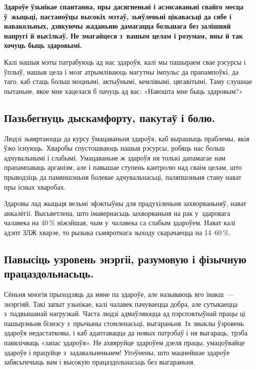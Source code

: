 \textbf{Здароўе ўзьнікае спантанна, пры дасягненьні і асэнсаваньні свайго месца ў~жыцьці, пастаноўцы высокіх мэтаў, зьяўленьні цікавасьці да сябе і навакольных, дзякуючы жаданьню дамагацца большага без залішняй напругі й высілкаў. Не змагайцеся з~вашым целам і розумам, яны й так хочуць быць здаровымі.}

Калі нашыя мэты патрабуюць ад нас здароўя, калі мы пашыраем свае рэсурсы і ўплыў, нашыя цела і мозг атрымліваюць магутны імпульс да прапампоўкі, да таго, каб стаць больш моцнымі, актыўнымі, кемлівымі, цягавітымі. Таму слушнае пытаньне, якое мне хацелася б пачуць ад вас: «Навошта мне быць здаровым?» 


\subsection*{Пазьбегнуць дыскамфорту, пакутаў і болю.}

Людзі зьвяртаюцца да курсу ўмацаваньня здароўя, каб вырашыць праблемы, якія ўжо існуюць. Хваробы спустошваюць нашыя рэсурсы, робяць нас больш адчувальнымі і слабымі. Умацаваньне ж здароўя ня толькі дапамагае нам прапампаваць арганізм, але і павышае ступень кантролю над сваім целам, што прыводзіць да памяншэньня болевае адчувальнасьці, паляпшэньня стану нават пры існых хваробах.

Здаровы лад жыцьця вельмі эфэктыўны для прадухіленьня захворваньняў, нават анкалёгіі. Высьветлена, што імавернасьць захворваньня на рак у~здаровага чалавека на 40\,\% ніжэйшая, чым у~чалавека са слабым здароўем. Нават калі адэпт ЗЛЖ хварэе, то рызыка сьмяротнага зыходу скарачаецца на 14--60\,\%.

\subsection*{Павысіць узровень энэргіі, разумовую і фізычную працаздольнасьць.} 
Сёньня многія прыходзяць да мяне па здароўе, але называюць яго інакш~--- энэргіяй. Такі запыт узьнікае, калі чалавек пачуваецца добра, але сутыкаецца з~падвышанай нагрузкай. Часта людзі адмаўляюцца ад пэрспэктыўнай працы ці пашырэньня бізнэсу з~прычыны стомленасьці, выгараньня. Іх звыклы ўзровень здароўя недастатковы, і каб адаптавацца да новых патрэбаў і ня выгараць, трэба павялічваць «запас здароўя». Не ахвяруйце здароўем дзеля працы, умацоўвайце здароўе і працуйце з~задавальненьнем! Упэўнены, што мацнейшае здароўе забясьпечыць вам і высокую працаздольнасьць без выгараньня.

